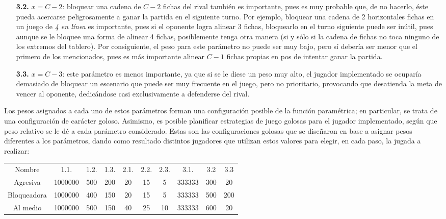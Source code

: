 \documentclass[12pt,a4paper]{article}
\begin{document}
\begin{itemize}
\begin{itemize}
                \item[\textbf{3.2.}] $x = C-2$: bloquear una cadena de $C-2$ fichas del rival también es importante, pues es muy probable que, de no hacerlo, éste pueda acercarse peligrosamente a ganar la partida en el siguiente turno. Por ejemplo, bloquear una cadena de 2 horizontales fichas en un juego de \textit{4 en línea} es importante, pues si el oponente logra alinear 3 fichas, bloquearlo en el turno siguiente puede ser inútil, pues aunque se le bloquee una forma de alinear 4 fichas, posiblemente tenga otra manera (si y sólo si la cadena de fichas no toca ninguno de los extremos del tablero). Por consiguiente, el peso para este parámetro no puede ser muy bajo, pero sí debería ser menor que el primero de los mencionados, pues es más importante alinear $C-1$ fichas propias en pos de intentar ganar la partida.
                \item[\textbf{3.3.}] $x = C-3$: este parámetro es menos importante, ya que si se le diese un peso muy alto, el jugador implementado se ocuparía demasiado de bloquear un escenario que puede ser muy frecuente en el juego, pero no prioritario, provocando que desatienda la meta de vencer al oponente, dedicándose casi exclusivamente a defenderse del rival.
            \end{itemize}
    \end{itemize}
    
    Los pesos asignados a cada uno de estos parámetros forman una configuración posible de la función paramétrica; en particular, se trata de una configuración de carácter goloso. Asimismo, es posible planificar estrategias de juego golosas para el jugador implementado, según que peso relativo se le dé a cada parámetro considerado. Estas son las configuraciones golosas que se diseñaron en base a asignar pesos diferentes a los parámetros, dando como resultado distintos jugadores que utilizan estos valores para elegir, en cada paso, la jugada a realizar:
    
    \begin{center}
		\begin{tabular}{ | c || c | c | c | c | c | c | c | c | c | }
		\hline
		Nombre &  1.1. &  1.2. &  1.3. &  2.1. &  2.2. &  2.3. &  3.1. &  3.2 &  3.3 \\ \hhline{|=#=|=|=|=|=|=|=|=|=|}
		    Agresiva &  1000000 &  500 &  200 &  20 &  15 &  5 &  333333 &  300 &  20 \\ \hline
		    Bloqueadora &  1000000 &  400 &  150 &  20 &  15 &  5 &  333333 &  500 &  200 \\ \hline
		    Al medio &  1000000 &  500 &  150 &  40 &  25 &  10 &  333333 &  600 &  20 \\ \hline
		\end{tabular}
    \end{center}
    
\end{document}
